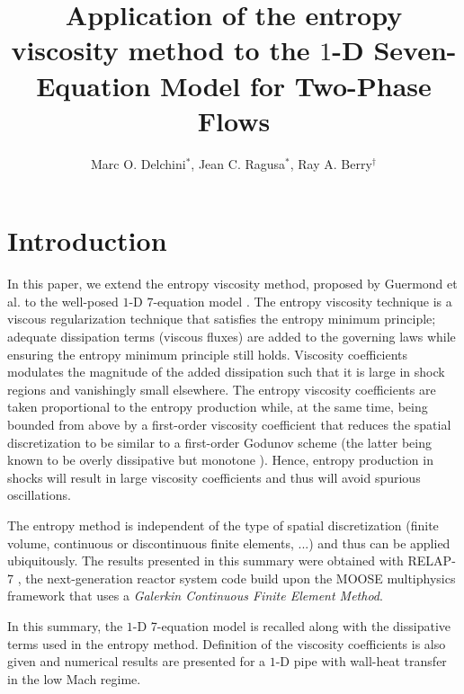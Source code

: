 \documentclass{anstrans}
\title{Application of the entropy viscosity method to the $1$-D Seven-Equation Model for Two-Phase Flows}
\author{Marc O. Delchini$^{*}$, Jean C. Ragusa$^{*}$, Ray A. Berry$^\dagger$}
\institute{
$^{*}$Department of Nuclear Engineering, Texas A\&M University, 
$^\dagger$Idaho National Laboratory
}
\begin{document}
\section{Introduction}
%
In this paper, we extend the entropy viscosity method, proposed by Guermond et al. \cite{jlg1, jlg2}
to the well-posed $1$-D 7-equation model \cite{DEM, berry}. The entropy viscosity technique is a viscous regularization technique
that satisfies the entropy minimum principle; adequate dissipation terms (viscous fluxes)
are added to the governing laws while ensuring the entropy minimum principle still holds.
Viscosity coefficients modulates the magnitude of the added dissipation such that it is
large in shock regions and vanishingly small elsewhere. The entropy viscosity coefficients
are taken proportional to the entropy production while, at the same time, being bounded
from above by a first-order viscosity coefficient that reduces the spatial discretization
to be similar to a first-order Godunov scheme (the latter being known to be overly dissipative but
monotone \cite{toro}). Hence, entropy production in shocks will result in large viscosity  
coefficients and thus will avoid spurious oscillations. 

The entropy method is independent of the type of spatial discretization (finite volume,
continuous or discontinuous finite elements, ...) and thus can be applied ubiquitously. 
The results presented in this summary were obtained with RELAP-7 \cite{Berry_2014}, the next-generation 
reactor system code build upon the MOOSE multiphysics framework
\cite{moose} that uses a \emph{Galerkin Continuous Finite Element Method}.

In this summary, the $1$-D 7-equation model is recalled along with the dissipative terms used 
in the entropy method. Definition of the viscosity coefficients is also given and numerical 
results are presented for a $1$-D pipe with wall-heat transfer in the low Mach regime.
%
\end{document}
